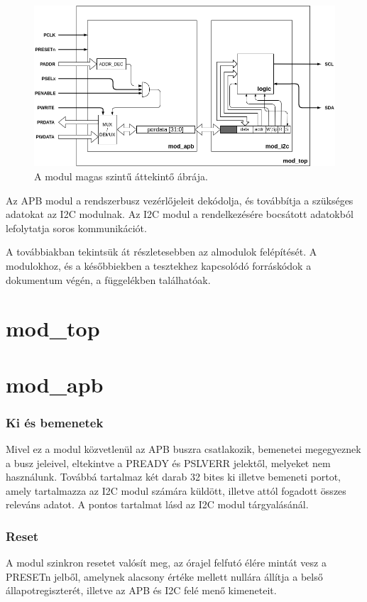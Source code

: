 \begin{figure}[ht!]
    \includegraphics[width=\textwidth]{figures/overview}
    \caption{A modul magas szintű áttekintő ábrája.}
    \label{fig:modtop}
\end{figure}

Az APB modul a rendszerbusz vezérlőjeleit dekódolja, és továbbítja a szükséges adatokat az I2C modulnak.
Az I2C modul a rendelkezésére bocsátott adatokból lefolytatja soros kommunikációt.

A továbbiakban tekintsük át részletesebben az almodulok felépítését. A modulokhoz, és a későbbiekben a tesztekhez kapcsolódó forráskódok a dokumentum végén, a függelékben találhatóak.

\section{mod\_top}

\section{mod\_apb}
\subsubsection{Ki és bemenetek}
Mivel ez a modul közvetlenül az APB buszra csatlakozik, bemenetei megegyeznek a busz jeleivel, eltekintve a PREADY és PSLVERR jelektől, melyeket nem használunk. Továbbá tartalmaz két darab 32 bites ki illetve bemeneti portot, amely tartalmazza az I2C modul számára küldött, illetve attól fogadott összes releváns adatot. A pontos tartalmat lásd az I2C modul tárgyalásánál.

\subsubsection{Reset}
    A modul szinkron resetet valósít meg, az órajel felfutó élére mintát vesz a PRESETn jelből, amelynek alacsony értéke mellett nullára állítja a belső állapotregiszterét, illetve az APB és I2C felé menő kimeneteit.

